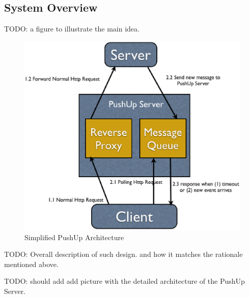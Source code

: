 \subsection{System Overview\\}

TODO: a figure to illustrate the main idea.

\begin{figure}[htb!]
\centering%
    \includegraphics[scale=0.40]{figures/simple_pushup_arch.eps}
    \caption{Simplified PushUp Architecture}
    \label{fig:eventloop}
\end{figure}

TODO: Overall description of such design. and how it matches the rationale mentioned above.

TODO: should add add picture with the detailed architecture of the PushUp Server.

